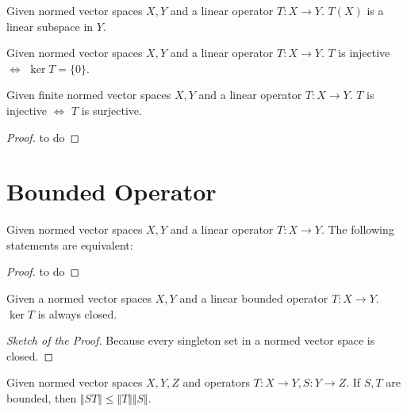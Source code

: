 \begin{theorem}
Given normed vector spaces $X, Y$ and a linear operator $T \colon X \to Y$. $T(X)$ is a linear subspace in $Y$. 
\end{theorem}

\begin{theorem}
Given normed vector spaces $X, Y$ and a linear operator $T \colon X \to Y$. $T$ is injective $\iff$ $\ker T = \{0\}$. 
\end{theorem}

\begin{theorem}
Given finite normed vector spaces $X, Y$ and a linear operator $T \colon X \to Y$. $T$ is injective $\iff$ $T$ is surjective. 
\end{theorem}

\begin{proof}
to do
\end{proof}

\section{Bounded Operator}
\begin{definition}
\end{definition}

\begin{theorem}
Given normed vector spaces $X, Y$ and a linear operator $T \colon X \to Y$. The following statements are equivalent: 
\end{theorem}

\begin{proof}
to do
\end{proof}

\begin{theorem}
Given a normed vector spaces $X, Y$ and a linear bounded operator $T \colon X \to Y$. $\ker T$ is always closed. 
\end{theorem}

\begin{proof}[Sketch of the Proof]
Because every singleton set in a normed vector space is closed. 
\end{proof}

\begin{theorem}
Given normed vector spaces $X, Y, Z$ and operators $T \colon X \to Y, S \colon Y \to Z$. If $S, T$ are bounded, then $\Vert S T \Vert \leq \Vert T \Vert \Vert S \Vert$. 
\end{theorem}


